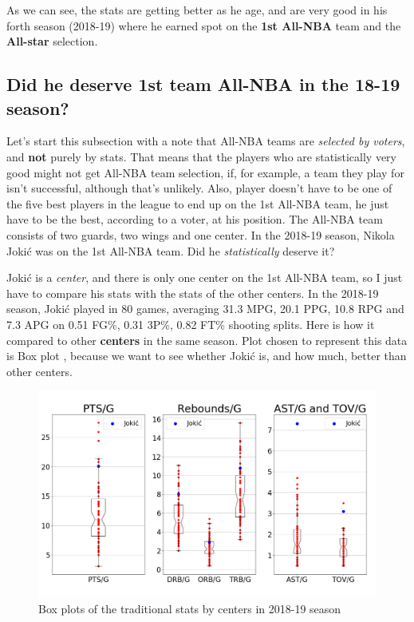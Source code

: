 \documentclass[a4paper]{article}
\begin{document}
As we can see, the stats are getting better as he age, and are very good in his forth season (2018-19) where he earned spot on the \textbf{1st All-NBA} team and the \textbf{All-star} selection.

\subsection{Did he deserve 1st team All-NBA in the 18-19 season?}
\label{subsec:jokic_all_nba}

Let's start this subsection with a note that All-NBA teams are \textit{selected by voters}, and \textbf{not} purely by stats. That means that the players who are statistically very good might not get All-NBA team selection, if, for example, a team they play for isn't successful, although that's unlikely. Also, player doesn't have to be one of the five best players in the league to end up on the 1st All-NBA team, he just have to be the best, according to a voter, at his position. The All-NBA team consists of two guards, two wings and one center. In the 2018-19 season, Nikola Joki\' c was on the 1st All-NBA team. Did he \textit{statistically} deserve it?

Joki\' c is a \textit{center}, and there is only one center on the 1st All-NBA team, so I just have to compare his stats with the stats of the other centers. In the 2018-19 season, Joki\' c played in 80 games, averaging 31.3 MPG, 20.1 PPG, 10.8 RPG and 7.3 APG on 0.51 FG\%, 0.31 3P\%, 0.82 FT\% shooting splits. Here is how it compared to other \textbf{centers} in the same season. Plot chosen to represent this data is Box plot \cite{boxplots}, because we want to see whether Joki\' c is, and how much, better than other centers.


\begin{figure}[h!]
\begin{center}
\includegraphics[scale=0.30]{centers_traditional.png}
\end{center}
\caption{Box plots of the traditional stats by centers in 2018-19 season}
\label{plt:centers_trad}
\end{figure}
\end{document}
